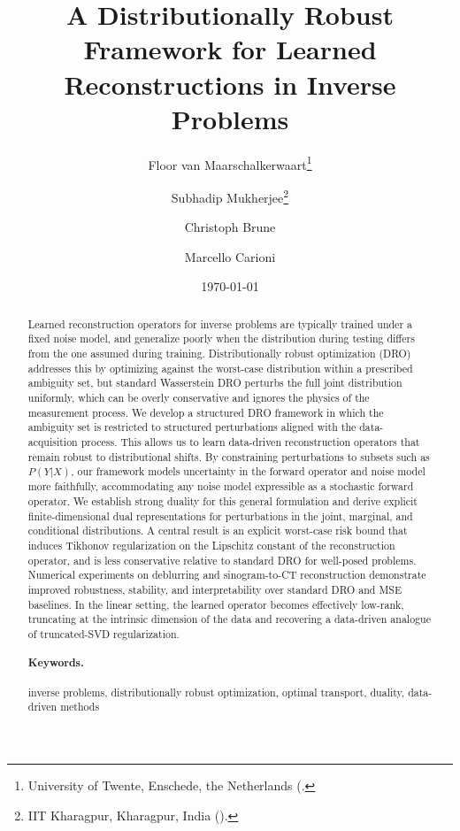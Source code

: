 \documentclass{article}
\title{A Distributionally Robust Framework for Learned Reconstructions in Inverse Problems}
\author{Floor van Maarschalkerwaart\thanks{University of Twente, Enschede, the Netherlands 
(\email{\{f.vanmaarschalkerwaart, c.brune, m.c.carioni\}@utwente.nl}.}
\and Subhadip Mukherjee\thanks{IIT Kharagpur, Kharagpur, India 
  (\email{smukherjee@ece.iitkgp.ac.in}).} 
\and Christoph Brune\footnotemark[1] 
\and Marcello Carioni\footnotemark[1]}
\date{\today}
\theoremstyle{definition}
\theoremstyle{remarksty}
\begin{document}
\maketitle
\begin{abstract}
Learned reconstruction operators for inverse problems are typically trained under a fixed noise model, and generalize poorly when the distribution during testing differs from the one assumed during training. Distributionally robust optimization (DRO) addresses this by optimizing against the worst-case distribution within a prescribed ambiguity set, but standard Wasserstein DRO perturbs the full joint distribution uniformly, which can be overly conservative and ignores the physics of the measurement process. We develop a structured DRO framework in which the ambiguity set is restricted to structured perturbations aligned with the data-acquisition process. This allows us to learn data-driven reconstruction operators that remain robust to distributional shifts. By constraining perturbations to subsets such as $P(Y|X)$, our framework models uncertainty in the forward operator and noise model more faithfully, accommodating any noise model expressible as a stochastic forward operator. We establish strong duality for this general formulation and derive explicit finite-dimensional dual representations for perturbations in the joint, marginal, and conditional distributions. A central result is an explicit worst-case risk bound that induces Tikhonov regularization on the Lipschitz constant of the reconstruction operator, and is less conservative relative to standard DRO for well-posed problems. Numerical experiments on deblurring and sinogram-to-CT reconstruction demonstrate improved robustness, stability, and interpretability over standard DRO and MSE baselines. In the linear setting, the learned operator becomes effectively low-rank, truncating at the intrinsic dimension of the data and recovering a data-driven analogue of truncated-SVD regularization.
\paragraph{Keywords.} inverse problems, distributionally robust optimization, optimal transport, duality, data-driven methods
\end{abstract}
\end{document}
